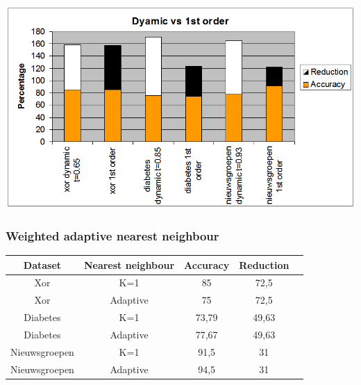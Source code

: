 \documentclass{article}
\begin{document}
\begin{center} \includegraphics[scale=0.5]{dynamic_vs_1storder} \end{center}

\subsubsection{Weighted adaptive nearest neighbour}

\begin{tabular}{|c|c|c|c|c|}  \hline	
Dataset & Nearest neighbour & Accuracy &	Reduction \\ \hline
Xor & K=1	& 85 &	72,5 \\
Xor & Adaptive &	75 &	72,5 \\
Diabetes & K=1 &	73,79 &	49,63 \\
Diabetes & Adaptive & 	77,67 &	49,63 \\
Nieuwsgroepen & K=1 &	91,5 &	31 \\
Nieuwsgroepen & Adaptive &	94,5 &	31 \\ \hline
\end{tabular} \\
\end{document}
